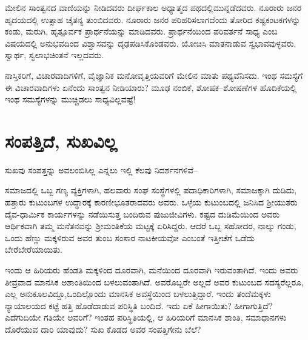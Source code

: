 ಮೇಲಿನ ಸಾಂತ್ವನದ ವಾಣಿಯನ್ನು ನೀಡಿದವರು ದೀರ್ಘಕಾಲ ಅಧ್ಯಾತ್ಮದ ಪಥದಲ್ಲಿ\break ಮುನ್ನಡೆ\-ದವರು. ನೂರಾರು ಜನರ ಹೃದಯದಲ್ಲಿ ಉತ್ಸಾಹ ಚೈತನ್ಯ ತುಂಬಿದವರು. ನೂರಾರು ಜನರ ಪರಿಹರಿಸಲಾಗದೆಂದು ತೋರಿದ ಕಷ್ಟಕಂಟಕಗಳನ್ನು ಕಂಡು, ಮರುಗಿ, ಹೃತ್ಪೂರ್ವಕ ಪ್ರಾರ್ಥನೆಯನ್ನು ಮಾಡಿದವರು. ಪ್ರಾರ್ಥನೆಯಿಂದ ಪರಿವರ್ತನೆ ಸಾಧ್ಯ ಎಂಬ ವಿಷಯದಲ್ಲಿ ಅನುಭವದಿಂದ ವಿಶ್ವಾಸವನ್ನು ದೃಢಪಡಿಸಿಕೊಂಡವರು. ಯೋಚಿಸಿ ಮಾತನಾಡುವ ಸ್ವಭಾವವುಳ್ಳವರು. ಸ್ವಾರ್ಥ, ಸ್ವಲಾಭಚಿಂತನೆ ಇಲ್ಲದವರು.

ನಾಸ್ತಿಕರಿಗೆ, ವಿಚಾರವಾದಿಗಳಿಗೆ, ವೈಜ್ಞಾನಿಕ ಮನೋವೃತ್ತಿಯವರಿಗೆ ಮೇಲಿನ ಮಾತು ಪಥ್ಯ\-ವೆನಿಸದು. ಇಂಥ ಸಮಸ್ಯೆಗೆ ಈ ವಿಚಾರವಾದಿಗಳು ಏನೆಂದು ಸಾಂತ್ವನ ನೀಡಿಯಾರು? ಮೂಢ ನಂಬಿಕೆ, ಶೋಷಕ–ಶೋಷಣೆಗಳ ಹೊದಿಕೆಯಲ್ಲಿ ಇಂಥ ಸಮಸ್ಯೆಗಳನ್ನು ಮುಚ್ಚಿಡಲು ಸಾಧ್ಯ\-ವಿಲ್ಲ\-ವಷ್ಟೆ!


\section*{ಸಂಪತ್ತಿದೆ, ಸುಖವಿಲ್ಲ}


ಸುಖವು ಸಂಪತ್ತನ್ನು ಅವಲಂಬಿಸಿಲ್ಲ ಎನ್ನಲು ಇಲ್ಲಿ ಕೆಲವು ನಿದರ್ಶನಗಳಿವೆ–

ಸಮಾಜದಲ್ಲಿ ಒಬ್ಬ ಗಣ್ಯ ವ್ಯಕ್ತಿಗಳಾಗಿ, ಹಲವಾರು ಸಂಘ ಸಂಸ್ಥೆಗಳಲ್ಲಿ ಪದಾಧಿಕಾರಿಗಳಾಗಿ, ಸಮಾಜಕ್ಕಾಗಿ ದುಡಿದು, ಹತ್ತಾರು ಕುಟುಂಬಗಳ ಉದ್ಧಾರಕ್ಕೆ ಕಾರಣೀಭೂತರಾದವರು ಅವರು. ಒಳ್ಳೆಯ ಕುಟುಂಬದಲ್ಲಿ ಜನಿಸಿದ ಶ‍್ರೀಯುತರು ದೈವ-ಧಾರ್ಮಿಕ ಕಾರ್ಯಗಳನ್ನು ನಡೆಯಿಸುತ್ತ ಬಂದಿರುವ ಪುಜುಜೀವಿಗಳು. ಕಷ್ಟದ ದುಡಿಮೆಯಿಂದ ಅವರು ಆರ್ಥಿಕವಾಗಿ ತಮ್ಮ ಮನೆತನವನ್ನು ಶ‍್ರೀಮಂತಿಕೆಯ ಮಟ್ಟಕ್ಕೆ ಏರಿಸಿದ್ದರು. ಆದರೆ ಒಬ್ಬ ಸಹೋದರ, ನಾಲ್ಕು ಗಂಡು, ಒಂದು ಹೆಣ್ಣು ಮಕ್ಕಳಿರುವ ಅವರ ತುಂಬ ಸಂಸಾರ ನಾಟಕೀಯವೋ ಎಂಬಂತೆ ಇತ್ತೀಚೆಗೆ ಒಡೆದು ಬೇರೆಬೇರೆಯಾಯಿತು.

ಇಂದು ಆ ಹಿರಿಯರು ಹೆಂಡತಿ ಮಕ್ಕಳಿಂದ ದೂರವಾಗಿ, ಮನೆಯಿಂದ ದೂರವಾಗಿ ಇರು\-ವಂತಾಗಿದೆ. ಇಂದು ಅವರು ತೀವ್ರವಾದ ಮಾನಸಿಕ ಅಶಾಂತಿಯಿಂದ ಬಳಲುವಂತಾಗಿದೆ. ಅವರೊಬ್ಬರೇ ಅಲ್ಲದೆ ಅವರ ಕುಟುಂಬದ ಸದಸ್ಯರೆಲ್ಲರೂ, ಎಲ್ಲ ಅನುಕೂಲವಿದ್ದೂ,\break ಒಂದಿಲ್ಲೊಂದು ಮಾನಸಿಕ ಅವಸ್ಥೆಯಿಂದ ಬಳಲುತ್ತಿದ್ದಾರೆ. ಇಂದು ತಂದೆಮಕ್ಕಳು ನ್ಯಾಯಾ\-ಲಯದ ಕಟ್ಟೆ ಹತ್ತಿ ಹೊಡೆದಾಡುವ ಪರಿಸ್ಥಿತಿ ಬಂದಿದೆ. ಇದು ಏಕೆ ಹೀಗಾಯಿತು? ಹೀಗಾಗುತ್ತಿದೆ? ಎದೆಗುದಿಯೇ ಗತಿಯೇ ಅವರಿಗೆ? ಇಂತಹ ಪರಿಸ್ಥಿತಿಯಲ್ಲಿ, ಆ ಹಿರಿಯರಿಗೆ ಮಾನಸಿಕ ಶಾಂತಿ, ಸಮಾಧಾನಗಳು ದೊರೆಯುವ ದಾರಿ ಯಾವುದು? ಸುಖ ಕೊಡದ ಅವರ ಸಂಪತ್ತಿಗೇನು ಬೆಲೆ?

